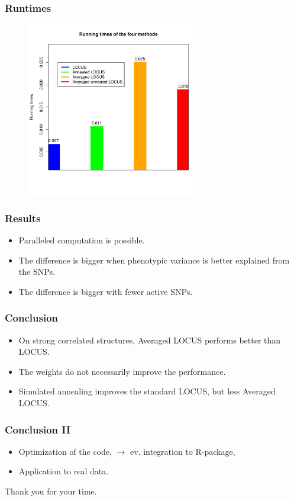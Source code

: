 \documentclass{beamer}
\begin{document}
\begin{frame}
\frametitle{Runtimes}
\begin{figure}
\includegraphics[width=3in]{images/runtimes.pdf}
\end{figure}
\end{frame}

\begin{frame}
\frametitle{Results}
\begin{itemize}
\item Paralleled computation is possible.
\item The difference is bigger when phenotypic variance is better explained from the SNPs.
\item The difference is bigger with fewer active SNPs.
\end{itemize}
\end{frame}

\begin{frame}
\frametitle{Conclusion}
\begin{itemize}
\item On strong correlated structures, Averaged LOCUS performs better than LOCUS.
\item The weights do not necessarily improve the performance.
\item Simulated annealing improves the standard LOCUS, but less Averaged LOCUS.
\end{itemize}
\end{frame}

\begin{frame}
\frametitle{Conclusion II}
\begin{itemize}
\item Optimization of the code, $\rightarrow$ ev. integration to R-package,
\item Application to real data.

\end{itemize}
\end{frame}

\begin{frame}
Thank you for your time.
\end{frame}
\end{document}
